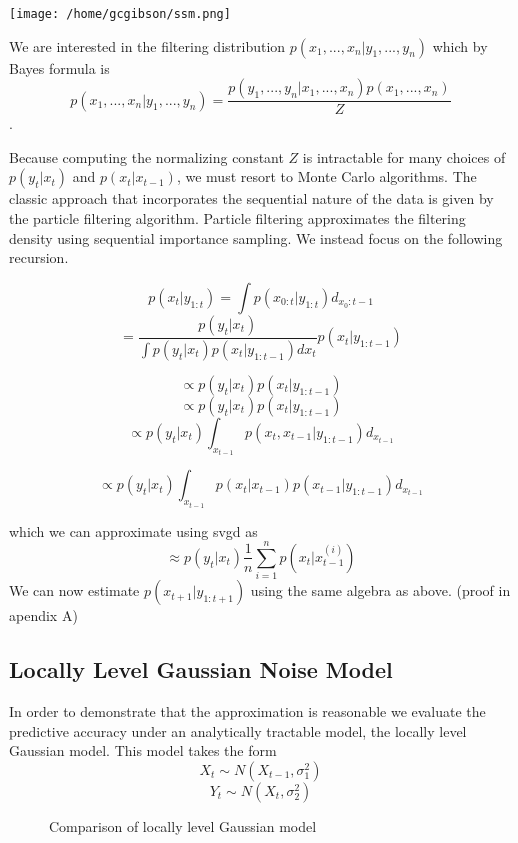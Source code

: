 \documentclass{article}
\begin{document}
\begin{center}
\texttt{[image: /home/gcgibson/ssm.png]}
\end{center}





We are interested in the filtering distribution $p(x_1,...,x_n | y_1,...,y_n)$ which by Bayes formula is $$p(x_1,...,x_n | y_1,...,y_n) = \frac{p(y_1,...,y_n | x_1,...,x_n) p(x_1,...,x_n)}{Z}$$.

Because computing the normalizing constant $Z$ is intractable for many choices of $p(y_t | x_t)$ and $p(x_t | x_{t-1})$, we must resort to Monte Carlo algorithms. The classic approach that incorporates the sequential nature of the data is given by the particle filtering algorithm. Particle filtering approximates the filtering density using sequential importance sampling. We instead focus on the following recursion. 

$$p(x_t | y_{1:t}) = \int p(x_{0:t} | y_{1:t})d_{x_0:t-1}$$
$$=\frac{p(y_t | x_t)}{\int p(y_t|x_t)p(x_t | y_{1:t-1})dx_t}p(x_t | y_{1:t-1})$$

$$\propto p(y_t|x_t)p(x_t | y_{1:t-1})$$
$$\propto p(y_t|x_t)p(x_t | y_{1:t-1})$$
$$\propto p(y_t|x_t)\int_{x_{t-1}}p(x_t,x_{t-1} | y_{1:t-1})d_{x_{t-1}}$$

$$\propto p(y_t|x_t)\int_{x_{t-1}}p(x_t |x_{t-1} )p(x_{t-1}| y_{1:t-1})d_{x_{t-1}}$$

which we can approximate using svgd as 
$$\approx p(y_t|x_t) \frac{1}{n}\sum_{i=1}^n p(x_t | x_{t-1}^{(i)})$$
We can now estimate $p(x_{t+1}|y_{1:t+1})$ using the same algebra as above. 
(proof in apendix A) 



\subsection*{Locally Level Gaussian Noise Model}
In order to demonstrate that the approximation is reasonable we evaluate the predictive accuracy under an analytically tractable model, the locally level Gaussian model. This model takes the form 
$$X_t \sim N(X_{t-1},\sigma_1^2)$$
$$Y_t \sim N(X_t, \sigma_2^2)$$


\begin{figure}[!tbp]
\centering
{}
  \hfill
  \caption{Comparison of locally level Gaussian model}
\end{figure}
\end{document}
